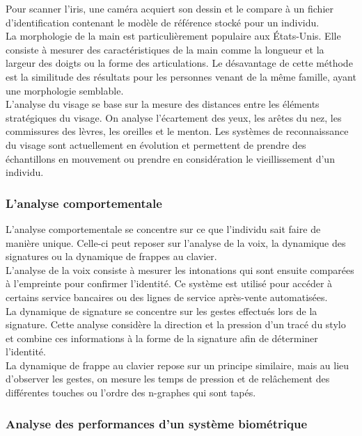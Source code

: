 Pour scanner l'iris, une caméra acquiert son dessin et le compare à un fichier d'identification contenant le modèle de référence stocké pour un individu.\\

La morphologie de la main est particulièrement populaire aux États-Unis. Elle consiste à mesurer des caractéristiques de la main comme la longueur et la largeur des doigts ou la forme des articulations. Le désavantage de cette méthode est la similitude des résultats pour les personnes venant de la même famille, ayant une morphologie semblable.\\

L'analyse du visage se base sur la mesure des distances entre les éléments stratégiques du visage. On analyse l'écartement des yeux,  les arêtes du nez, les commissures des lèvres, les oreilles et le menton. Les systèmes de reconnaissance du visage sont actuellement en évolution et permettent de prendre des échantillons en mouvement ou prendre en considération le vieillissement d'un individu.

\subsubsection{L'analyse comportementale}

L'analyse comportementale se concentre sur ce que l'individu sait faire de manière unique. Celle-ci peut reposer sur l'analyse de la voix, la dynamique des signatures ou la dynamique de frappes au clavier.\\

L'analyse de la voix consiste à mesurer les intonations qui sont ensuite comparées à l'empreinte pour confirmer l'identité. Ce système est utilisé pour accéder à certains service bancaires ou des lignes de service après-vente automatisées.\\

La dynamique de signature se concentre sur les gestes effectués lors de la signature. Cette analyse considère la direction et la pression d'un tracé du stylo et combine ces informations à la forme de la signature afin de déterminer l'identité.\\

La dynamique de frappe au clavier repose sur un principe similaire, mais au lieu d'observer les gestes, on mesure les temps de pression et de relâchement des différentes touches\cite{giotGREYC} ou l'ordre des n-graphes qui sont tapés\cite{bergadano2002,gunetti2005}.

\subsubsection{Analyse des performances d'un système biométrique}

